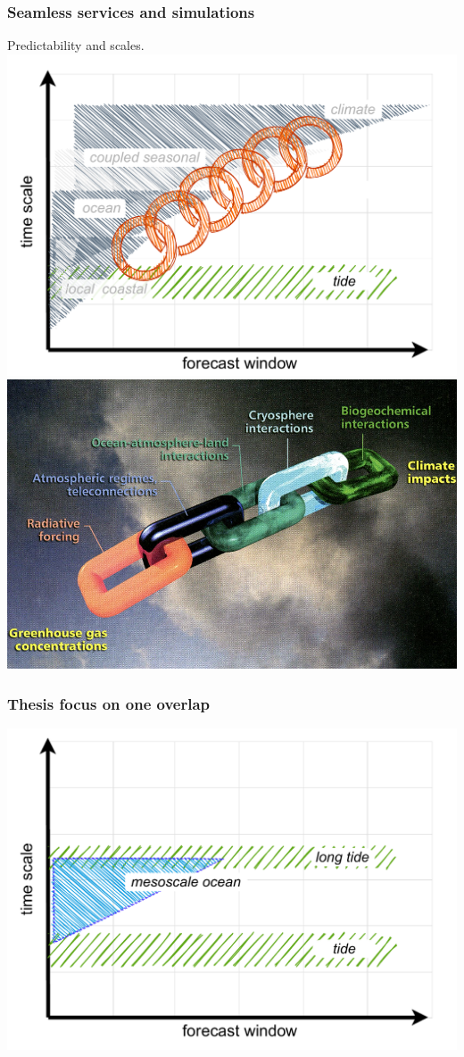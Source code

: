 \begin{frame}
\frametitle{Seamless services and simulations }
Predictability and scales.
\includegraphics[height=0.7\textheight]{figures/diagrams/scales_with_chain_labelled.pdf}
\includegraphics[height=0.2\textheight]{figures/images/PalmerChain.png}
\end{frame}
\begin{frame}
\frametitle{Thesis focus on one overlap}
     \includegraphics[height=0.7\textheight]{figures/diagrams/scales_focus.pdf}
\end{frame}
